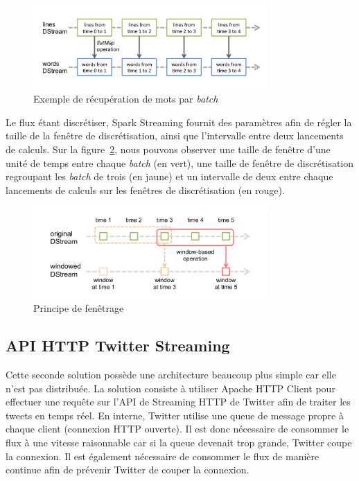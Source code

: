   \begin{figure}
    \centering
    \includegraphics[width=0.8\textwidth]{images/streaming-dstream-ops.png}
    \caption{Exemple de récupération de mots par \emph{batch}}
    \label{streaming_dstream_get_word}
  \end{figure}

  Le flux étant discrétiser, Spark Streaming fournit des paramètres afin de régler la taille de la fenêtre de discrétisation, ainsi que l'intervalle entre deux lancements de calculs. Sur la figure~\ref{principe_de_fenetre_spark_streaming}, nous pouvons observer une taille de fenêtre d'une unité de temps entre chaque \emph{batch} (en vert), une taille de fenêtre de discrétisation regroupant les \emph{batch} de trois (en jaune) et un intervalle de deux entre chaque lancements de calculs sur les fenêtres de discrétisation (en rouge).

  \begin{figure}
    \centering
    \includegraphics[width=0.8\textwidth]{images/streaming-dstream-window.png}
    \caption{Principe de fenêtrage}
    \label{principe_de_fenetre_spark_streaming}
  \end{figure}

  \subsection{API HTTP Twitter Streaming }
  \label{sub:API HTTP Twitter Streaming}
  Cette seconde solution possède une architecture beaucoup plus simple car elle n'est pas distribuée. La solution consiste à utiliser Apache HTTP Client pour effectuer une requête sur l'API de Streaming HTTP de Twitter afin de traiter les tweets en temps réel. En interne, Twitter utilise une queue de message propre à chaque client (connexion HTTP ouverte). Il est donc nécessaire de consommer le flux à une vitesse raisonnable car si la queue devenait trop grande, Twitter coupe la connexion. Il est également nécessaire de consommer le flux de manière continue afin de prévenir Twitter de couper la connexion.\\

